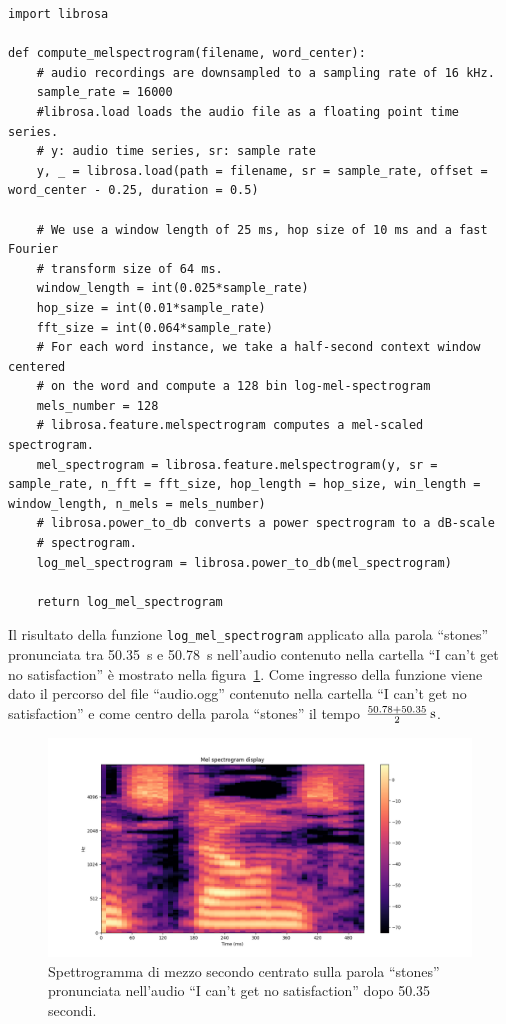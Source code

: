 \documentclass[12pt,a4paper,titlepage]{article}
\begin{document}
\begin{lstlisting}[language=iPython,firstnumber=1, caption=mel\_spectrogram.py, label=mel_spectrogram,captionpos=b]
import librosa

def compute_melspectrogram(filename, word_center):
    # audio recordings are downsampled to a sampling rate of 16 kHz.
    sample_rate = 16000
    #librosa.load loads the audio file as a floating point time series.
    # y: audio time series, sr: sample rate
    y, _ = librosa.load(path = filename, sr = sample_rate, offset = word_center - 0.25, duration = 0.5)

    # We use a window length of 25 ms, hop size of 10 ms and a fast Fourier
    # transform size of 64 ms.
    window_length = int(0.025*sample_rate)
    hop_size = int(0.01*sample_rate)
    fft_size = int(0.064*sample_rate)
    # For each word instance, we take a half-second context window centered
    # on the word and compute a 128 bin log-mel-spectrogram
    mels_number = 128
    # librosa.feature.melspectrogram computes a mel-scaled spectrogram.
    mel_spectrogram = librosa.feature.melspectrogram(y, sr = sample_rate, n_fft = fft_size, hop_length = hop_size, win_length = window_length, n_mels = mels_number)
    # librosa.power_to_db converts a power spectrogram to a dB-scale
    # spectrogram.
    log_mel_spectrogram = librosa.power_to_db(mel_spectrogram)
    
    return log_mel_spectrogram
\end{lstlisting}

Il risultato della funzione \texttt{log\_mel\_spectrogram} applicato alla parola ``stones'' pronunciata tra \SI{50.35}{\second} e \SI{50.78}{\second} nell'audio contenuto nella cartella ``I can't get no satisfaction'' è mostrato nella figura~\ref{fig:stones_spec}. Come ingresso della funzione viene dato il percorso del file ``audio.ogg'' contenuto nella cartella ``I can't get no satisfaction'' e come centro della parola ``stones'' il tempo $\SI[parse-numbers=false]{\frac{50.78 + 50.35}{2}}{\second}$.

\begin{figure}[h]
	\centering	
	\includegraphics[width=1\textwidth]{../Stones_spectrogram}
	\caption{Spettrogramma di mezzo secondo centrato sulla parola ``stones'' pronunciata nell'audio ``I can't get no satisfaction'' dopo 50.35 secondi.}
	\label{fig:stones_spec}
\end{figure}
\end{document}
